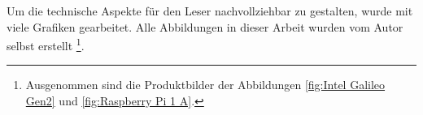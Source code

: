\par
Um die technische Aspekte für den Leser nachvollziehbar zu gestalten, wurde mit viele Grafiken gearbeitet. Alle Abbildungen in dieser Arbeit wurden vom Autor selbst erstellt \footnote{Ausgenommen sind die Produktbilder der Abbildungen \ref{fig:Intel Galileo Gen2} und \ref{fig:Raspberry Pi 1 A}.}. 












\begin{comment}

In der heutigen Zeit ist die nachhaltige Produktion von Energie und ein schonender Umgang mit dieser Ressource ein wichtiges Anliegen der Öffentlichkeit. Speziell die IT-Branche ist von einem grossen Wachstum geprägt. Immer mehr Tätigkeiten werden automatisiert und bestehende Systeme ausgebaut. Dies verursacht einen immer grösseren Stromverbrauch im IT-Bereich. Ein Ziel der Energiepolitik 2050 ist die Senkung des immer weiter steigenden Energieverbrauchs.
\par
Um in der IT-Branche Energie zu sparen, können verschiedene Ansätze gewählt werden. Beispielsweise besteht die Möglichkeit bei Inaktivität automatisch in den Ruhemodus zu wechseln oder die Prozessoren durch sogenannte Sparmodi, insbesondere dynamische Taktfrequenzen oder das kurzzeitige Ein- und Ausschalten der Rechnereinheit, zu optimieren. Diese Sparansätze zielen jeweils nur auf den Hard- oder Softwarebereich ab. Sie berücksichtigen jedoch nicht die besondere Funktionsweise eines jeden Computers, wo die Software die Hardware, also ein Programm einen Prozessor, ansteuert. Anders im Rahmen dieser Arbeit, in welcher das Sparpotenzial bereichsübergreifend erforscht wird.



\section{Übersicht}


\end{comment}
